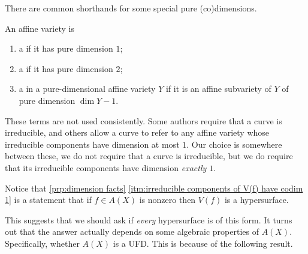 \documentclass[fleqn]{NotesClass}
\begin{document}
    There are common shorthands for some special pure (co)dimensions.
    
    \begin{dfn}{}{}
        An affine variety is
        \begin{enumerate}
            \item a  if it has pure dimension \(1\);
            \item a  if it has pure dimension \(2\);
            \item a  in a pure-dimensional affine variety \(Y\) if it is an affine subvariety of \(Y\) of pure dimension \(\dim Y - 1\).
        \end{enumerate}
    \end{dfn}
    
    \begin{wrn}
        These terms are not used consistently.
        Some authors require that a curve is irreducible, and others allow a curve to refer to any affine variety whose irreducible components have dimension at most \(1\).
        Our choice is somewhere between these, we do not require that a curve is irreducible, but we do require that its irreducible components have dimension \emph{exactly} \(1\).
    \end{wrn}
    
    Notice that \cref{prp:dimension facts} \cref{itm:irreducible components of V(f) have codim 1} is a statement that if \(f \in A(X)\) is nonzero then \(V(f)\) is a hypersurface.
    
    This suggests that we should ask if \emph{every} hypersurface is of this form.
    It turns out that the answer actually depends on some algebraic properties of \(A(X)\).
    Specifically, whether \(A(X)\) is a UFD.
    This is because of the following result.
    
\end{document}
